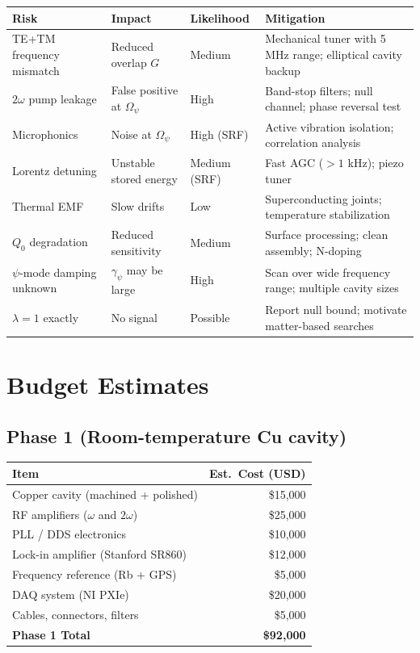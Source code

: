\documentclass[12pt,letterpaper]{article}
\begin{document}
\begin{longtable}{p{3.5cm}p{4cm}p{2cm}p{4.5cm}}
\toprule
\textbf{Risk} & \textbf{Impact} & \textbf{Likelihood} & \textbf{Mitigation} \\
\midrule
\endfirsthead
TE+TM frequency mismatch & Reduced overlap $G$ & Medium &
  Mechanical tuner with 5 MHz range; elliptical cavity backup \\
$2\omega$ pump leakage & False positive at $\Omega_\psi$ & High &
  Band-stop filters; null channel; phase reversal test \\
Microphonics & Noise at $\Omega_\psi$ & High (SRF) &
  Active vibration isolation; correlation analysis \\
Lorentz detuning & Unstable stored energy & Medium (SRF) &
  Fast AGC ($> 1$ kHz); piezo tuner \\
Thermal EMF & Slow drifts & Low &
  Superconducting joints; temperature stabilization \\
$Q_0$ degradation & Reduced sensitivity & Medium &
  Surface processing; clean assembly; N-doping \\
$\psi$-mode damping unknown & $\gamma_\psi$ may be large & High &
  Scan over wide frequency range; multiple cavity sizes \\
$\lambda = 1$ exactly & No signal & Possible &
  Report null bound; motivate matter-based searches \\
\bottomrule
\end{longtable}

\section{Budget Estimates}

\subsection{Phase 1 (Room-temperature Cu cavity)}

\begin{tabular}{lr}
\toprule
Item & Est.\ Cost (USD) \\
\midrule
Copper cavity (machined + polished) & \$15,000 \\
RF amplifiers ($\omega$ and $2\omega$) & \$25,000 \\
PLL / DDS electronics & \$10,000 \\
Lock-in amplifier (Stanford SR860) & \$12,000 \\
Frequency reference (Rb + GPS) & \$5,000 \\
DAQ system (NI PXIe) & \$20,000 \\
Cables, connectors, filters & \$5,000 \\
\midrule
\textbf{Phase 1 Total} & \textbf{\$92,000} \\
\bottomrule
\end{tabular}
\end{document}
